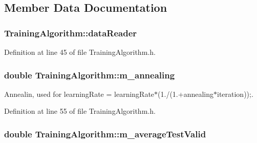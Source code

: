 \subsection{Member Data Documentation}
\subsubsection[{\texorpdfstring{data\+Reader}{dataReader}}]{ Training\+Algorithm\+::data\+Reader\hspace{0.3cm}{\ttfamily [private]}}\hypertarget{classTrainingAlgorithm_a79d1135058e08e7f0bc2ca3d7fabd777}{}\label{classTrainingAlgorithm_a79d1135058e08e7f0bc2ca3d7fabd777}


Definition at line 45 of file Training\+Algorithm.\+h.

\subsubsection[{\texorpdfstring{m\+\_\+annealing}{m_annealing}}]{\setlength{\rightskip}{0pt plus 5cm}double Training\+Algorithm\+::m\+\_\+annealing\hspace{0.3cm}{\ttfamily [private]}}\hypertarget{classTrainingAlgorithm_a6a3f866fd846b14fa8065d18287e93a9}{}\label{classTrainingAlgorithm_a6a3f866fd846b14fa8065d18287e93a9}


Annealin, used for learning\+Rate = learning\+Rate$\ast$(1./(1.+annealing$\ast$iteration));. 



Definition at line 55 of file Training\+Algorithm.\+h.

\subsubsection[{\texorpdfstring{m\+\_\+average\+Test\+Valid}{m_averageTestValid}}]{\setlength{\rightskip}{0pt plus 5cm}double Training\+Algorithm\+::m\+\_\+average\+Test\+Valid\hspace{0.3cm}{\ttfamily [private]}}\hypertarget{classTrainingAlgorithm_a33cb16c48262985040967e045c75bff3}{}\label{classTrainingAlgorithm_a33cb16c48262985040967e045c75bff3}


